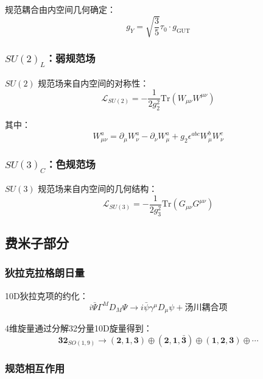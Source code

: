 规范耦合由内空间几何确定：
\begin{equation}
    g_Y = \sqrt{\frac{3}{5}}\tau_0 \cdot g_{\text{GUT}}
\end{equation}

\subsubsection{$SU(2)_L$：弱规范场}

$SU(2)$ 规范场来自内空间的对称性：
\begin{equation}
    \mathcal{L}_{SU(2)} = -\frac{1}{2g_2^2}\text{Tr}(W_{\mu\nu}W^{\mu\nu})
\end{equation}

其中：
\begin{equation}
    W_{\mu\nu}^a = \partial_\mu W_\nu^a - \partial_\nu W_\mu^a + g_2\epsilon^{abc}W_\mu^b W_\nu^c
\end{equation}

\subsubsection{$SU(3)_C$：色规范场}

$SU(3)$ 规范场来自内空间的几何结构：
\begin{equation}
    \mathcal{L}_{SU(3)} = -\frac{1}{2g_3^2}\text{Tr}(G_{\mu\nu}G^{\mu\nu})
\end{equation}

\subsection{费米子部分}

\subsubsection{狄拉克拉格朗日量}

10D狄拉克项的约化：
\begin{equation}
    i\bar{\Psi}\Gamma^M D_M \Psi \to i\bar{\psi}\gamma^\mu D_\mu \psi + \text{汤川耦合项}
\end{equation}

4维旋量通过分解32分量10D旋量得到：
\begin{equation}
    \mathbf{32}_{SO(1,9)} \to (\mathbf{2}, \mathbf{1}, \mathbf{3}) \oplus (\mathbf{2}, \mathbf{1}, \bar{\mathbf{3}}) \oplus (\mathbf{1}, \mathbf{2}, \mathbf{3}) \oplus \cdots
\end{equation}

\subsubsection{规范相互作用}

